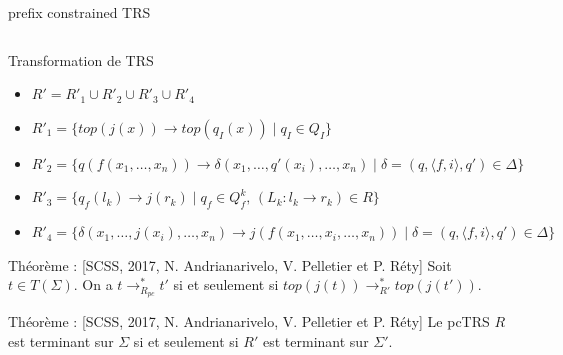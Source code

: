 \documentclass[xcolor={dvipsnames}]{beamer}
\begin{document}
\begin{frame}{prefix constrained TRS}
\begin{example}
\begin{columns}
\begin{column}{0.5\textwidth}
\begin{overprint}
        \end{overprint}
      \end{column}
    \end{columns}
  \end{example}
\end{frame}

\begin{frame}{Transformation de TRS}
  \begin{itemize}
  \item $R' = R'_1 \cup R'_2 \cup R'_3 \cup R'_4$
  \item $R'_1 = \{top(j(x)) \rightarrow top(q_I(x)) \mid q_I \in Q_I\}$
  \item $R'_2= \{q(f(x_1,\ldots,x_n))\rightarrow \delta(x_1,\ldots,q'(x_i),\ldots,x_n) \mid \delta=(q, \langle f,i \rangle, q') \in \Delta\}$
  \item $R'_3= \{q_f(l_k) \rightarrow j(r_k) \mid q_f \in Q_f^k,\, (L_k : l_k \rightarrow r_k) \in R\}$
  \item $R'_4= \{\delta(x_1,\ldots,j(x_i),\ldots,x_n)\rightarrow j(f(x_1,\ldots,x_i,\ldots,x_n)) \mid \delta=(q, \langle f,i \rangle, q') \in \Delta\}$
  \end{itemize}
  \begin{alertblock}{Théorème : {\small[SCSS, 2017, N. Andrianarivelo, V. Pelletier et P. Réty]}}
    Soit $t \in T(\Sigma)$. On a $t \rightarrow^*_{R_{pc}} t'$ si et seulement si $top(j(t)) \rightarrow^*_{R'} top(j(t'))$.
  \end{alertblock}
  \begin{alertblock}{Théorème : {\small[SCSS, 2017, N. Andrianarivelo, V. Pelletier et P. Réty]}}
    Le pcTRS $R$ est terminant sur $\Sigma$ si et seulement si $R'$ est terminant sur $\Sigma'$.
  \end{alertblock}
\end{frame}
\end{document}
